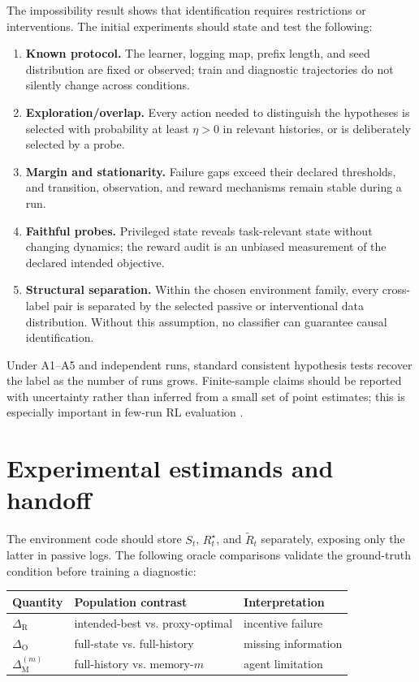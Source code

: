 \documentclass[9pt,twocolumn]{extarticle}
\begin{document}
The impossibility result shows that identification requires restrictions or
interventions. The initial experiments should state and test the following:
\begin{enumerate}[label=\textbf{A\arabic*.}]
\item \textbf{Known protocol.} The learner, logging map, prefix length, and seed
distribution are fixed or observed; train and diagnostic trajectories do not
silently change across conditions.
\item \textbf{Exploration/overlap.} Every action needed to distinguish the
hypotheses is selected with probability at least $\eta>0$ in relevant
histories, or is deliberately selected by a probe.
\item \textbf{Margin and stationarity.} Failure gaps exceed their declared
thresholds, and transition, observation, and reward mechanisms remain stable
during a run.
\item \textbf{Faithful probes.} Privileged state reveals task-relevant state
without changing dynamics; the reward audit is an unbiased measurement of the
declared intended objective.
\item \textbf{Structural separation.} Within the chosen environment family,
every cross-label pair is separated by the selected passive or interventional
data distribution. Without this assumption, no classifier can guarantee
causal identification.
\end{enumerate}

Under A1--A5 and independent runs, standard consistent hypothesis tests recover
the label as the number of runs grows. Finite-sample claims should be reported
with uncertainty rather than inferred from a small set of point estimates;
this is especially important in few-run RL evaluation
\cite{agarwal2021precipice}.

\section{Experimental estimands and handoff}

The environment code should store $S_t$, $R_t^\star$, and $\widetilde R_t$
separately, exposing only the latter in passive logs. The following oracle
comparisons validate the ground-truth condition before training a diagnostic:
\begin{center}
\scriptsize
\begin{tabularx}{\columnwidth}{@{}lXX@{}}
\toprule
Quantity & Population contrast & Interpretation\\
\midrule
$\Delta_{\mathrm R}$ & intended-best vs. proxy-optimal & incentive failure\\
$\Delta_{\mathrm O}$ & full-state vs. full-history & missing information\\
$\Delta_{\mathrm M}^{(m)}$ & full-history vs. memory-$m$ & agent limitation\\
\bottomrule
\end{tabularx}
\end{center}
\end{document}
